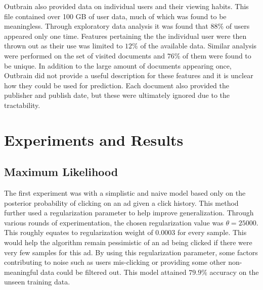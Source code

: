 \documentclass[fleqn,10pt]{SelfArx} %
\begin{document}
Outbrain also provided data on individual users and their viewing habits. This file contained over 100 GB of user data, much of which was found to be meaningless. Through exploratory data analysis it
was found that $88\%$ of users appeared only one time. Features pertaining the the individual user were then thrown out as their use was limited to $12\%$ of the available data. Similar
analysis were performed on the set of visited documents and $76\%$ of them were found to be unique. In addition to the large amount of documents appearing once, Outbrain did not provide
a useful description for these features and it is unclear how they could be used for prediction. Each document also provided the publisher and publish date, but these were ultimately ignored
due to the tractability.






\section{Experiments and Results}

\subsection{Maximum Likelihood}

The first experiment was with a simplistic and naive model based only on the posterior probability of clicking on an ad given a click history. This method further used a regularization parameter to help improve generalization. Through various rounds of experimentation, the chosen regularization value was $\theta = 25000$. This roughly equates to regularization weight of $0.0003$ for every sample. This would help the algorithm remain pessimistic of an ad being clicked if there were very few samples for this ad. By using this regularization parameter, some factors contributing to noise such as users mis-clicking or providing some other non-meaningful data could be filtered out.  This model attained $79.9\%$ accuracy on the unseen training data.
\end{document}
